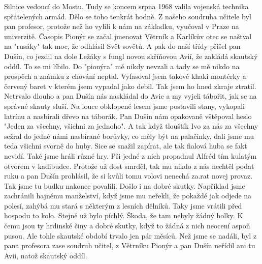 
Silnice vedoucí do Mostu. Tudy se koncem srpna 1968 valila vojenská
technika spřátelených armád. Dělo se toho tenkrát hodně. Z našeho
soudruha učitele byl pan profesor, protože než ho vylili k nám na
základku, vyučoval v Praze na univerzitě. Časopis Pionýr se začal
jmenovat Větrník a Karlíkův otec se naštval na "rusáky" tak moc, že
odhlásil Svět sovětů. A pak do naší třídy přišel pan Dušín, co jezdil
na dole Ležáky s fungl novou skříňovou Avií, že zakládá skautský
oddíl. To se mi líbilo. Do "pionýra" mě nikdy nevzali a tady se mě
nikdo na prospěch a známku z chování neptal. Vyfasoval jsem takové
khaki montérky a červený baret v kterém jsem vypadal jako debil. Tak
jsem ho hned zkraje ztratil. Netrvalo dlouho a pan Dušín nás naskládal
do Avie a my vyjeli tábořit, jak se na správné skauty sluší. Na louce
    obklopené lesem jsme postavili stany, vykopali latrínu a nasbírali
    dřevo na táborák. Pan Dušín nám opakovaně vštěpoval heslo "Jeden
    za všechny, všichni za jednoho". A tak když tlouštík Ivo za nás za
    všechny sežral do jedné námi nasbírané borůvky, co měly být na
    palačinky, dali jsme mu teda všichni svorně do huby. Sice se
    snažil zapírat, ale tak fialová huba se fakt nevidí. Také jsme
    hráli různé hry. Při jedné z nich propadnul Alfréd tím kulatým
    otvorem v kadibudce. Protože už dost smrděl, tak mu nikdo z nás
    nechtěl podat ruku a pan Dušín prohlásil, že si kvůli tomu volovi
    nenechá za.rat novej provaz. Tak jsme tu budku nakonec povalili.
    Došlo i na dobré skutky. Například jsme zachránili hajnému
    manželství, když jsme mu neřekli, že pokaždé jak odjede na polesí,
    zahýbá mu stará s některým z lesních dělníků. Taky jsme vrátili
    před hospodu to kolo. Stejně už bylo píchlý. Škoda, že tam nebyly
    žádný holky. K čemu jsou ty hrdinské činy a dobré skutky, když to
    žádná z nich neocení aspoň pusou. Ale tohle skautské období trvalo
    jen pár měsíců. Než jsme se nadáli, byl z pana profesora zase
    soudruh učitel, z Větrníku Pionýr a pan Dušín neřídil ani tu Avii,
    natož skautský oddíl.

